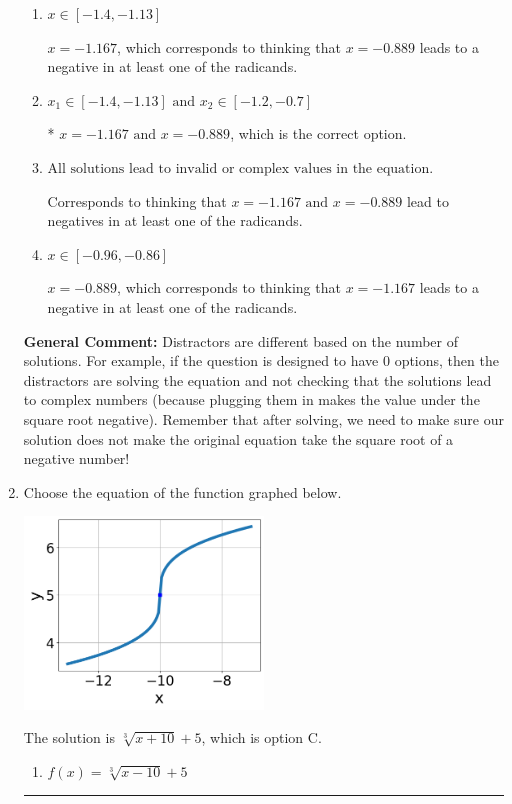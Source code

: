 \documentclass{extbook}[14pt]
\newcommand{\litem}[1]{\item #1

\rule{\textwidth}{0.4pt}}
\begin{document}
\begin{enumerate}
{\begin{enumerate}[label=\Alph*.]
$x = 0.889 \text{ and } x = 1.167$, which are the negative or absolute values of the values you would have gotten by solving the equation correctly.
\item \( x \in [-1.4,-1.13] \)

$x = -1.167$, which corresponds to thinking that $x = -0.889$ leads to a negative in at least one of the radicands.
\item \( x_1 \in [-1.4, -1.13] \text{ and } x_2 \in [-1.2,-0.7] \)

* $x = -1.167 \text{ and } x = -0.889$, which is the correct option.
\item \( \text{All solutions lead to invalid or complex values in the equation.} \)

Corresponds to thinking that $x = -1.167 \text{ and } x = -0.889$ lead to negatives in at least one of the radicands.
\item \( x \in [-0.96,-0.86] \)

$x = -0.889$, which corresponds to thinking that $x = -1.167$ leads to a negative in at least one of the radicands.
\end{enumerate}

\textbf{General Comment:} Distractors are different based on the number of solutions. For example, if the question is designed to have 0 options, then the distractors are solving the equation and not checking that the solutions lead to complex numbers (because plugging them in makes the value under the square root negative). Remember that after solving, we need to make sure our solution does not make the original equation take the square root of a negative number!
}
\litem{
Choose the equation of the function graphed below.

\begin{center}
    \includegraphics[width=0.5\textwidth]{../Figures/radicalGraphToEquationCopyA.png}
\end{center}


The solution is \( \sqrt[3]{x + 10} + 5 \), which is option C.\begin{enumerate}[label=\Alph*.]
\item \( f(x) = \sqrt[3]{x - 10} + 5 \)


\end{enumerate}}
\end{enumerate}
\end{document}
